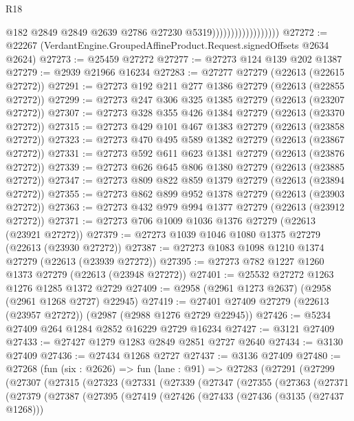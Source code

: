 \begin{lexlean}{R18}
\begin{coremodule}
                                        @182
                                        @2849
                                        @2849
                                        @2639
                                        @2786
                                        @27230
                                        @5319))))))))))))))))))
@27272 := @22267 (VerdantEngine.GroupedAffineProduct.Request.signedOffsets @2634 @2624)
@27273 := @25459 @27272
@27277 := @27273 @124 @139 @202 @1387
@27279 := @2939 @21966 @16234
@27283 := @27277 @27279 (@22613 (@22615 @27272))
@27291 := @27273 @192 @211 @277 @1386 @27279 (@22613 (@22855 @27272))
@27299 := @27273 @247 @306 @325 @1385 @27279 (@22613 (@23207 @27272))
@27307 := @27273 @328 @355 @426 @1384 @27279 (@22613 (@23370 @27272))
@27315 := @27273 @429 @101 @467 @1383 @27279 (@22613 (@23858 @27272))
@27323 := @27273 @470 @495 @589 @1382 @27279 (@22613 (@23867 @27272))
@27331 := @27273 @592 @611 @623 @1381 @27279 (@22613 (@23876 @27272))
@27339 := @27273 @626 @645 @806 @1380 @27279 (@22613 (@23885 @27272))
@27347 := @27273 @809 @822 @859 @1379 @27279 (@22613 (@23894 @27272))
@27355 := @27273 @862 @899 @952 @1378 @27279 (@22613 (@23903 @27272))
@27363 := @27273 @432 @979 @994 @1377 @27279 (@22613 (@23912 @27272))
@27371 := @27273 @706 @1009 @1036 @1376 @27279 (@22613 (@23921 @27272))
@27379 := @27273 @1039 @1046 @1080 @1375 @27279 (@22613 (@23930 @27272))
@27387 := @27273 @1083 @1098 @1210 @1374 @27279 (@22613 (@23939 @27272))
@27395 := @27273 @782 @1227 @1260 @1373 @27279 (@22613 (@23948 @27272))
@27401 := @25532 @27272 @1263 @1276 @1285 @1372 @2729
@27409 := @2958 (@2961 @1273 @2637) (@2958 (@2961 @1268 @2727) @22945)
@27419 := @27401 @27409 @27279 (@22613 (@23957 @27272)) (@2987 (@2988 @1276 @2729 @22945))
@27426 := @5234 @27409 @264 @1284 @2852 @16229 @2729 @16234
@27427 := @3121 @27409
@27433 := @27427 @1279 @1283 @2849 @2851 @2727 @2640
@27434 := @3130 @27409
@27436 := @27434 @1268 @2727
@27437 := @3136 @27409
@27480 := @27268
    (fun (six : @2626) =>
    fun (lane : @91) =>
    @27283
      (@27291
        (@27299
          (@27307
            (@27315
              (@27323
                (@27331
                  (@27339
                    (@27347
                      (@27355
                        (@27363
                          (@27371
                            (@27379
                              (@27387
                                (@27395
                                  (@27419
                                    (@27426
                                      (@27433
                                        (@27436 (@3135 (@27437 @1268)))

\end{coremodule}
\end{lexlean}
